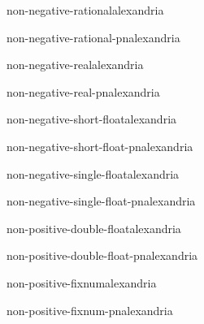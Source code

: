 \begin{type}{non-negative-rational}{}{alexandria}{}
  
\end{type}

\begin{function}{non-negative-rational-p}{n}{alexandria}{}
  
\end{function}

\begin{type}{non-negative-real}{}{alexandria}{}
  
\end{type}

\begin{function}{non-negative-real-p}{n}{alexandria}{}
  
\end{function}

\begin{type}{non-negative-short-float}{}{alexandria}{}
  
\end{type}

\begin{function}{non-negative-short-float-p}{n}{alexandria}{}
  
\end{function}

\begin{type}{non-negative-single-float}{}{alexandria}{}
  
\end{type}

\begin{function}{non-negative-single-float-p}{n}{alexandria}{}
  
\end{function}

\begin{type}{non-positive-double-float}{}{alexandria}{}
  
\end{type}

\begin{function}{non-positive-double-float-p}{n}{alexandria}{}
  
\end{function}

\begin{type}{non-positive-fixnum}{}{alexandria}{}
  
\end{type}

\begin{function}{non-positive-fixnum-p}{n}{alexandria}{}
  
\end{function}

